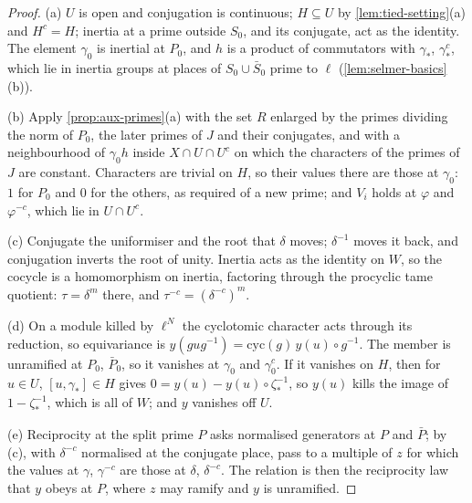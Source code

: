 \begin{proof}
(a) $U$ is open and conjugation is continuous; $H\subseteq U$ by \cref{lem:tied-setting}(a) and $H^c=H$; inertia at a prime outside $S_0$, and its conjugate, act as the identity. The element $\gamma_0$ is inertial at $P_0$, and $h$ is a product of commutators with $\gamma_*$, $\gamma_*^c$, which lie in inertia groups at places of $S_0\cup\bar S_0$ prime to
$\ell$ (\cref{lem:selmer-basics}(b)).

(b) Apply \cref{prop:aux-primes}(a) with the set $R$ enlarged by the primes dividing the norm of $P_0$, the later primes of $J$ and their conjugates, and with a neighbourhood of $\gamma_0h$ inside $X\cap U\cap U^c$ on which the characters of the primes of $J$ are constant. Characters are trivial on $H$, so their values there are those at
$\gamma_0$: $1$ for $P_0$ and $0$ for the others, as required of a new prime; and $V_i$ holds at $\varphi$ and $\varphi^{-c}$, which lie in $U\cap U^c$.

(c) Conjugate the uniformiser and the root that $\delta$ moves; $\delta^{-1}$ moves it back, and conjugation inverts the root of unity. Inertia acts as the identity on $W$, so the cocycle is a homomorphism on inertia, factoring through the procyclic tame quotient: $\tau=\delta^m$ there, and $\tau^{-c}=(\delta^{-c})^m$.

(d) On a module killed by $\ell^N$ the cyclotomic character acts through its reduction, so equivariance is $y(gug^{-1})=\mathrm{cyc}(g)\,y(u)\circ g^{-1}$. The member is unramified at $P_0$, $\bar P_0$, so it vanishes at $\gamma_0$ and $\gamma_0^c$. If it vanishes on $H$, then for $u\in U$, $[u,\gamma_*]\in H$ gives
$0=y(u)-y(u)\circ\zeta_*^{-1}$, so $y(u)$ kills the image of $1-\zeta_*^{-1}$, which is all of $W$; and $y$ vanishes off $U$.

(e) Reciprocity at the split prime $P$ asks normalised generators at $P$ and $\bar P$; by (c), with $\delta^{-c}$ normalised at the conjugate place, pass to a multiple of $z$ for which the values at $\gamma$, $\gamma^{-c}$ are those at $\delta$, $\delta^{-c}$. The relation is then the reciprocity law that $y$ obeys at $P$, where $z$ may ramify
and $y$ is unramified.
\end{proof}

